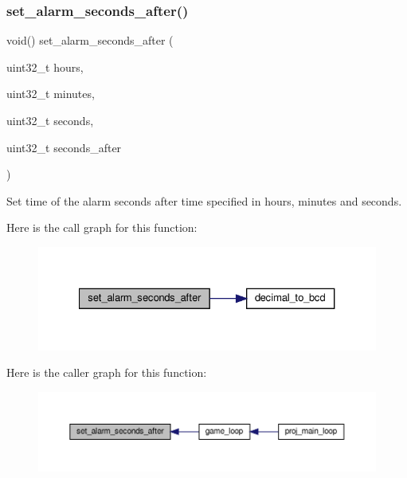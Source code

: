 \subsubsection{\texorpdfstring{set\+\_\+alarm\+\_\+seconds\+\_\+after()}{set\_alarm\_seconds\_after()}}
{\footnotesize\ttfamily void() set\+\_\+alarm\+\_\+seconds\+\_\+after (\begin{DoxyParamCaption}\item[{uint32\+\_\+t}]{hours,  }\item[{uint32\+\_\+t}]{minutes,  }\item[{uint32\+\_\+t}]{seconds,  }\item[{uint32\+\_\+t}]{seconds\+\_\+after }\end{DoxyParamCaption})}



Set time of the alarm seconds after time specified in hours, minutes and seconds. 

Here is the call graph for this function\+:
\nopagebreak
\begin{figure}[H]
\begin{center}
\leavevmode
\includegraphics[width=327pt]{group__rtc_ga48e4065b3387c3e8c78a1e114c73554e_cgraph}
\end{center}
\end{figure}
Here is the caller graph for this function\+:
\nopagebreak
\begin{figure}[H]
\begin{center}
\leavevmode
\includegraphics[width=350pt]{group__rtc_ga48e4065b3387c3e8c78a1e114c73554e_icgraph}
\end{center}
\end{figure}
\mbox{\label{group__rtc_ga298c9a14801d124c4b3a61a7dd0dc5f6}} 
